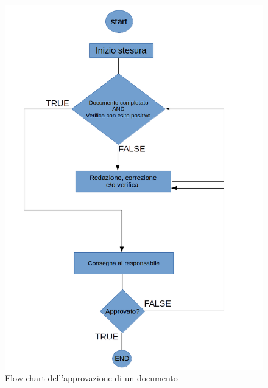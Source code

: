 \begin{figure}[h]
	\centering
	\includegraphics[scale=0.4]{img/flussoapprovazione.png}
	\caption{Flow chart dell'approvazione di un documento}\label{sec:Figura2}
\end{figure}

\newpage
